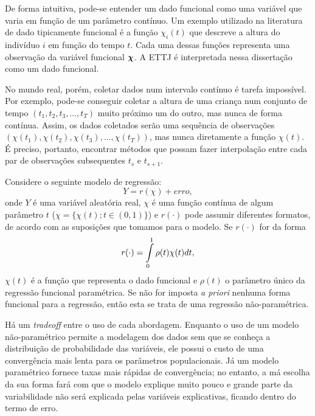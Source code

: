 \documentclass[
	12pt,				%
	openright,			%
	oneside,			%
	a4paper,			%
	english,			%
	brazil				%
	]{dissertacao-ufrgs-abntex2}
\begin{document}
De forma intuitiva, pode-se entender um dado funcional como uma variável
que varia em função de um parâmetro contínuo. Um exemplo utilizado
na literatura de dado tipicamente funcional é a função $\chi_{i}(t)$
que descreve a altura do indivíduo $i$ em função do tempo $t$. Cada
uma dessas funções representa uma observação da variável funcional
$\boldsymbol{\chi}$. A ETTJ é interpretada nessa dissertação
como um dado funcional.

No mundo real, porém, coletar dados num intervalo contínuo é tarefa
impossível. Por exemplo, pode-se conseguir coletar a altura de uma
criança num conjunto de tempo $(t_{1},t_{2},t_{3},...,t_{T})$ muito
próximo um do outro, mas nunca de forma contínua. Assim, os dados coletados serão 
uma sequência de observações $(\chi(t_{1}),\chi(t_{2}),\chi(t_{3}),...,\chi(t_{T}))$,
mas nunca diretamente a função $\chi(t)$. É preciso, portanto, encontrar
métodos que possam fazer interpolação entre cada par de
observações subsequentes $t_{s}$ e $t_{s+1}$.

Considere o seguinte modelo de regressão:
\begin{equation}
Y=r(\chi)+erro,\label{eq:modelo_regressao_basica}
\end{equation}
onde $Y$ é uma variável aleatória real, $\chi$ é uma função contínua
de algum parâmetro $t$ ($\chi=\{\chi(t);t\in(0,1)\}$) e $r(\cdot)$
pode assumir diferentes formatos, de acordo com as suposições que
tomamos para o modelo. Se $r(\cdot)$ for da forma
\begin{equation}
r(\cdot)=\intop_{0}^{1}\rho(t)\chi(t)dt,
\end{equation}
$\chi(t)$ é a função que representa o dado funcional e $\rho(t)$
o parâmetro único da regressão funcional paramétrica. Se não for imposta
\emph{a priori} nenhuma forma funcional para a regressão, então esta
se trata de uma regressão não-paramétrica.

Há um \emph{tradeoff} entre o uso de cada abordagem. Enquanto o uso de um
modelo não-paramétrico permite a modelagem dos dados sem que se conheça
a distribuição de probabilidade das variáveis, ele possui o custo
de uma convergência mais lenta para os parâmetros populacionais. Já
um modelo paramétrico fornece taxas mais rápidas de convergência;
no entanto, a má escolha da sua forma fará com que o modelo explique
muito pouco e grande parte da variabilidade não será explicada pelas
variáveis explicativas, ficando dentro do termo de erro.
\end{document}
